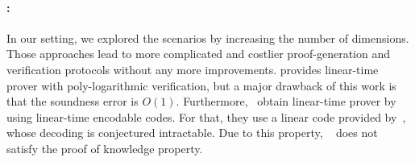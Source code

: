 \paragraph*{\name:}
In our setting, we explored the scenarios by increasing the number of dimensions. Those approaches lead to more complicated and costlier proof-generation and verification protocols without any more improvements. \cite{bootle2020zero} provides linear-time prover with poly-logarithmic verification, but a major drawback of this work is that the soundness error is $O(1)$. Furthermore,~\cite{bootle2020linear} obtain linear-time prover by using linear-time encodable codes. For that, they use a linear code provided by~\cite{druk2014linear}, whose decoding is conjectured intractable. Due to this property, ~\cite{bootle2020linear} does not satisfy the proof of knowledge property.

